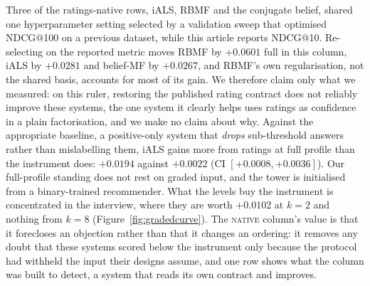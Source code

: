 \documentclass[acmsmall,review,anonymous]{acmart}
\begin{document}
Three of the ratings-native rows, iALS, RBMF and the conjugate belief, shared one hyperparameter setting selected by a validation sweep that optimised NDCG@100 on a previous dataset, while this article reports NDCG@10. Re-selecting on the reported metric moves RBMF by $+0.0601$ full in this column, iALS by $+0.0281$ and belief-MF by $+0.0267$, and RBMF's own regularisation, not the shared basis, accounts for most of its gain. We therefore claim only what we measured: on this ruler, restoring the published rating contract does not reliably improve these systems, the one system it clearly helps uses ratings as confidence in a plain factorisation, and we make no claim about why. Against the appropriate baseline, a positive-only system that \emph{drops} sub-threshold answers rather than mislabelling them, iALS gains more from ratings at full profile than the instrument does: $+0.0194$ against $+0.0022$ (CI $[+0.0008,+0.0036]$). Our full-profile standing does not rest on graded input, and the tower is initialised from a binary-trained recommender. What the levels buy the instrument is concentrated in the interview, where they are worth $+0.0102$ at $k{=}2$ and nothing from $k{=}8$ (Figure~\ref{fig:gradedcurve}). The \textsc{native} column's value is that it forecloses an objection rather than that it changes an ordering: it removes any doubt that these systems scored below the instrument only because the protocol had withheld the input their designs assume, and one row shows what the column was built to detect, a system that reads its own contract and improves.
\end{document}
